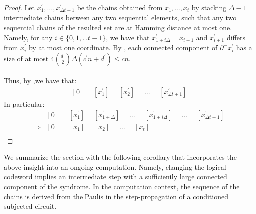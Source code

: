 \begin{proof}
  Let $x_{1}^{\prime}, \ldots, x^{\prime}_{\Delta t + 1}$ be the chains obtained from $x_{1}, \ldots, x_{t}$ by stacking $\Delta-1$ intermediate chains between any two sequential elements, such that any two sequential chains of the resulted set are at Hamming distance at most one. Namely, for any $i \in \{0, 1, \ldots t-1 \} $, we have that $x_{1 + i\Delta}^{\prime} = x_{i + 1}$ and $x^{\prime}_{i+1}$ differs from $x^{\prime}_{i}$ by at most one coordinate. By , each connected component of $\partial^{-}x^{\prime}_{i}$ has a size of at most $4{ d^{\prime} \choose 2 }\Delta (c^{\prime} n+d^{\prime}) \le c n$. 

  \paragraph{}
  Thus, by ,we have that:
  \begin{equation*}
    \begin{split}
      [0] = [x_{1}^{\prime}] =[x_{2}^{\prime}] = \ldots = [x_{\Delta t + 1}^{\prime}] 
    \end{split}
  \end{equation*}
  In particular: 
  \begin{equation*}
    \begin{split}
      & [0] = [x_{1}^{\prime}] =[x_{1 + \Delta}^{\prime}] = \ldots  =  [x_{1 + i \Delta}^{\prime} ]  =  \ldots = [x_{\Delta t + 1}^{\prime}] \\
      \Rightarrow  & [0] = [x_{1}] =[x_{2}] =   \ldots = [x_{t}] \\
    \end{split}
  \end{equation*}
\end{proof}




We summarize the section with the following corollary that incorporates the above insight into an ongoing computation. Namely, changing the logical codeword implies an intermediate step with a sufficiently large connected component of the syndrome. In the computation context, the sequence of the chains is derived from the Paulis in the step-propagation of a conditioned subjected circuit. 


